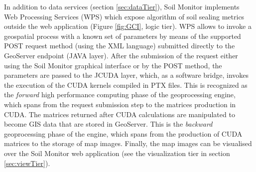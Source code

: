 \documentclass[APA,LATO1COL,doublespace]{WileyNJD-v2}
\newcommand{\toberevised}[1]{\emph{\textcolor{red}{#1}}} %
\begin{document}
In addition to data services (section \ref{sec:dataTier}), Soil Monitor implements Web Processing Services (WPS) which expose algorithm of soil sealing metrics outside the web application (Figure \ref{fig:GCI}, logic tier). 
WPS allows to invoke a geospatial process with a known set of parameters by means of the supported POST request method (using the XML language) submitted directly to the GeoServer endpoint (JAVA layer).
After the submission of the request either using the Soil Monitor graphical interface or by the POST method, the parameters are passed to the JCUDA layer, which, as a software bridge, invokes the execution of the CUDA kernels compiled in PTX files.
This is recognized as the \textit{forward} high performance computing phase of the geoprocessing engine, which spans from the request submission step to the matrices production in CUDA.
The matrices returned after CUDA calculations are manipulated to become GIS data that are stored in GeoServer.
This is the \textit{backward} geoprocessing phase of the engine, which spans from the production of CUDA matrices to the storage of map images.
Finally, the map images can be visualised over the Soil Monitor web application (see the visualization tier in section \ref{sec:viewTier}).

\end{document}
